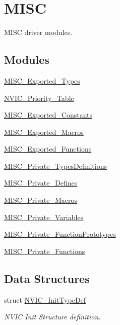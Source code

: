 \hypertarget{group___m_i_s_c}{\section{M\-I\-S\-C}
\label{group___m_i_s_c}
}


M\-I\-S\-C driver modules.  


\subsection*{Modules}
\begin{DoxyCompactItemize}
\item 
\hyperlink{group___m_i_s_c___exported___types}{M\-I\-S\-C\-\_\-\-Exported\-\_\-\-Types}
\item 
\hyperlink{group___n_v_i_c___priority___table}{N\-V\-I\-C\-\_\-\-Priority\-\_\-\-Table}
\item 
\hyperlink{group___m_i_s_c___exported___constants}{M\-I\-S\-C\-\_\-\-Exported\-\_\-\-Constants}
\item 
\hyperlink{group___m_i_s_c___exported___macros}{M\-I\-S\-C\-\_\-\-Exported\-\_\-\-Macros}
\item 
\hyperlink{group___m_i_s_c___exported___functions}{M\-I\-S\-C\-\_\-\-Exported\-\_\-\-Functions}
\item 
\hyperlink{group___m_i_s_c___private___types_definitions}{M\-I\-S\-C\-\_\-\-Private\-\_\-\-Types\-Definitions}
\item 
\hyperlink{group___m_i_s_c___private___defines}{M\-I\-S\-C\-\_\-\-Private\-\_\-\-Defines}
\item 
\hyperlink{group___m_i_s_c___private___macros}{M\-I\-S\-C\-\_\-\-Private\-\_\-\-Macros}
\item 
\hyperlink{group___m_i_s_c___private___variables}{M\-I\-S\-C\-\_\-\-Private\-\_\-\-Variables}
\item 
\hyperlink{group___m_i_s_c___private___function_prototypes}{M\-I\-S\-C\-\_\-\-Private\-\_\-\-Function\-Prototypes}
\item 
\hyperlink{group___m_i_s_c___private___functions}{M\-I\-S\-C\-\_\-\-Private\-\_\-\-Functions}
\end{DoxyCompactItemize}
\subsection*{Data Structures}
\begin{DoxyCompactItemize}
\item 
struct \hyperlink{struct_n_v_i_c___init_type_def}{N\-V\-I\-C\-\_\-\-Init\-Type\-Def}
\begin{DoxyCompactList}\small\item\em N\-V\-I\-C Init Structure definition. \end{DoxyCompactList}\end{DoxyCompactItemize}
